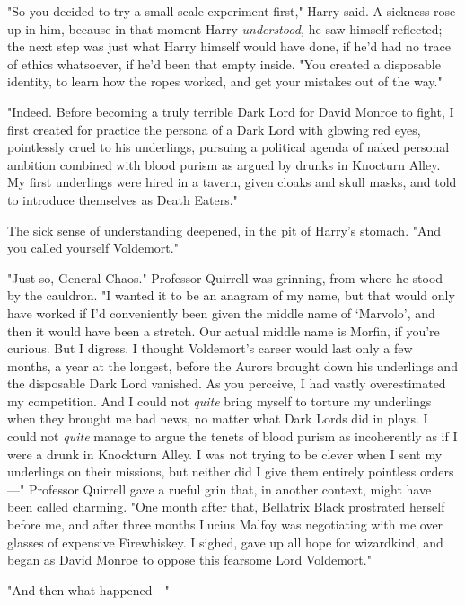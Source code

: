 "So you decided to try a small-scale experiment first," Harry said. A sickness
rose up in him, because in that moment Harry \emph{understood,} he saw himself
reflected; the next step was just what Harry himself would have done, if he'd
had no trace of ethics whatsoever, if he'd been that empty inside. "You created
a disposable identity, to learn how the ropes worked, and get your mistakes out
of the way."

"Indeed. Before becoming a truly terrible Dark Lord for David Monroe to fight,
I first created for practice the persona of a Dark Lord with glowing red eyes,
pointlessly cruel to his underlings, pursuing a political agenda of naked
personal ambition combined with blood purism as argued by drunks in Knocturn
Alley. My first underlings were hired in a tavern, given cloaks and skull
masks, and told to introduce themselves as Death Eaters."

The sick sense of understanding deepened, in the pit of Harry's stomach. "And
you called yourself Voldemort."

"Just so, General Chaos." Professor Quirrell was grinning, from where he stood
by the cauldron. "I wanted it to be an anagram of my name, but that would only
have worked if I'd conveniently been given the middle name of `Marvolo', and
then it would have been a stretch. Our actual middle name is Morfin, if you're
curious. But I digress. I thought Voldemort's career would last only a few
months, a year at the longest, before the Aurors brought down his underlings
and the disposable Dark Lord vanished. As you perceive, I had vastly
overestimated my competition. And I could not \emph{quite} bring myself to
torture my underlings when they brought me bad news, no matter what Dark Lords
did in plays. I could not \emph{quite} manage to argue the tenets of blood
purism as incoherently as if I were a drunk in Knockturn Alley. I was not
trying to be clever when I sent my underlings on their missions, but neither
did I give them entirely pointless orders\mbox{---}" Professor Quirrell gave a rueful
grin that, in another context, might have been called charming. "One month
after that, Bellatrix Black prostrated herself before me, and after three
months Lucius Malfoy was negotiating with me over glasses of expensive
Firewhiskey. I sighed, gave up all hope for wizardkind, and began as David
Monroe to oppose this fearsome Lord Voldemort."

"And then what happened\mbox{---}"

